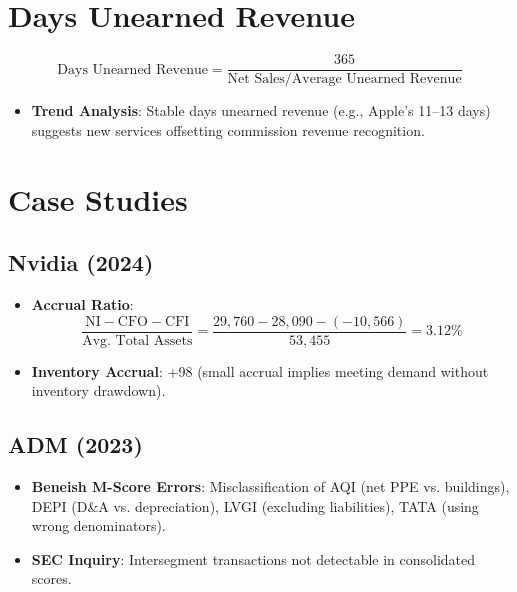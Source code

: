 \documentclass{article}
\begin{document}
\section{Days Unearned Revenue}
\[
\text{Days Unearned Revenue} = \frac{365}{\text{Net Sales} / \text{Average Unearned Revenue}}
\]
\begin{itemize}
    \item \textbf{Trend Analysis}: Stable days unearned revenue (e.g., Apple’s 11–13 days) suggests new services offsetting commission revenue recognition.
\end{itemize}

\section{Case Studies}
\subsection{Nvidia (2024)}
\begin{itemize}
    \item \textbf{Accrual Ratio}: 
    \[
    \frac{\text{NI} - \text{CFO} - \text{CFI}}{\text{Avg. Total Assets}} = \frac{29,760 - 28,090 - (-10,566)}{53,455} = 3.12\%
    \]
    \item \textbf{Inventory Accrual}: +98 (small accrual implies meeting demand without inventory drawdown).
\end{itemize}

\subsection{ADM (2023)}
\begin{itemize}
    \item \textbf{Beneish M-Score Errors}: Misclassification of AQI (net PPE vs. buildings), DEPI (D\&A vs. depreciation), LVGI (excluding liabilities), TATA (using wrong denominators).
    \item \textbf{SEC Inquiry}: Intersegment transactions not detectable in consolidated scores.
\end{itemize}
\end{document}
